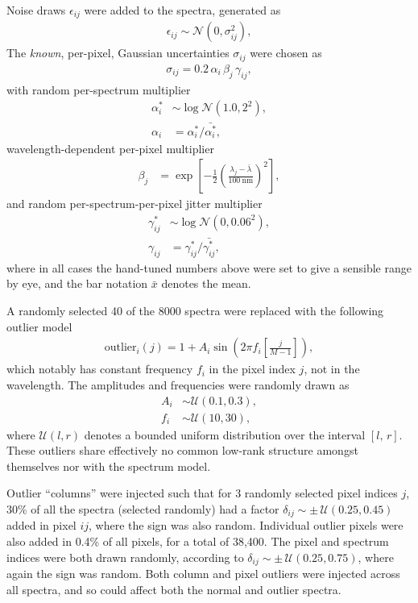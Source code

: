 \documentclass[onecolumn,floatfix,linenumbers,trackchanges]{aastex631}
\begin{document}
Noise draws $\epsilon_{ij}$ were added to the spectra, generated as
\begin{align}
    \epsilon_{ij} \sim \mathcal{N} \left( 0, \sigma_{ij}^2\right),
\end{align}
The \emph{known}, per-pixel, Gaussian uncertainties $\sigma_{ij}$ were chosen as
\begin{align}
    \sigma_{ij} = 0.2 \, \alpha_i \, \beta_j \, \gamma_{ij},
\end{align}
with random per-spectrum multiplier
\begin{align}
    \alpha_i^* &\sim \log{\mathcal{N}} \left( 1.0, 2^2 \right), \\
    \alpha_i &= \alpha_i^* / \bar{\alpha_i^*},
\end{align}
wavelength-dependent per-pixel multiplier
\begin{align}
    \beta_j &= \exp{\left[ - \frac{1}{2} \left( \frac{\lambda_j - \bar{\lambda}}{100~\mathrm{nm}} \right)^2  \right]},
\end{align}
and random per-spectrum-per-pixel jitter multiplier
\begin{align}
    \gamma_{ij}^* &\sim \log{\mathcal{N}} \left( 0, 0.06^2 \right), \\
    \gamma_{ij} &= \gamma_{ij}^* / \bar{\gamma_{ij}^*},
\end{align}
where in all cases the hand-tuned numbers above were set to give a sensible range by eye, and the bar notation $\bar{x}$ denotes the mean.

A randomly selected 40 of the 8000 spectra were replaced with the following outlier model
\begin{align}
    \mathrm{outlier}_{i}(j) = 1 + A_i \sin{\left( 2\pi f_i \left[\frac{j}{M-1}\right] \right)},
\end{align}
which notably has constant frequency $f_i$ in the pixel index $j$, not in the wavelength.
The amplitudes and frequencies were randomly drawn as
\begin{align}
    A_i &\sim \mathcal{U} \left( 0.1, 0.3 \right), \\
    f_i &\sim \mathcal{U} \left( 10, 30 \right),
\end{align}
where $\mathcal{U} \left( l, r \right)$ denotes a bounded uniform distribution over the interval $[l,\,r]$.
These outliers share effectively no common low-rank structure amongst themselves nor with the spectrum model.

Outlier ``columns'' were injected such that for 3 randomly selected pixel indices $j$, 30\% of all the spectra (selected randomly) had a factor $\delta_{ij} \sim \pm\,\mathcal{U} \left( 0.25, 0.45 \right)$ added in pixel $ij$, where the sign was also random.
Individual outlier pixels were also added in 0.4\% of all pixels, for a total of 38,400.
The pixel and spectrum indices were both drawn randomly, according to $\delta_{ij} \sim \pm\,\mathcal{U} \left( 0.25, 0.75 \right)$, where again the sign was random.
Both column and pixel outliers were injected across all spectra, and so could affect both the normal and outlier spectra.
\end{document}
